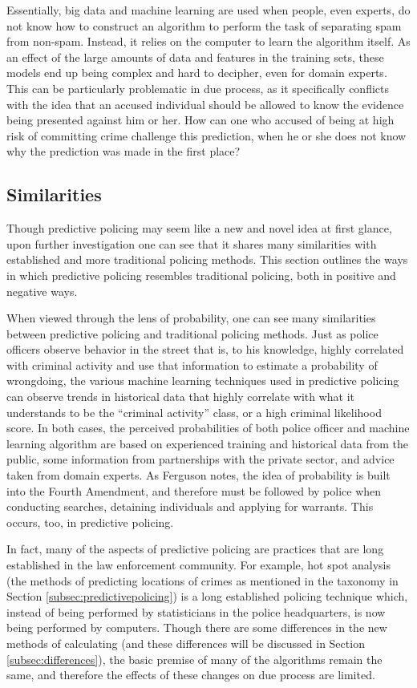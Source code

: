 \documentclass[12pt]{article} %
\begin{document}
Essentially, big data and machine learning are used when people, even experts, do not know how to construct an algorithm to perform the task of separating spam from non-spam. Instead, it relies on the computer to learn the algorithm itself. As an effect of the large amounts of data and features in the training sets, these models end up being complex and hard to decipher, even for domain experts. This can be particularly problematic in due process, as it specifically conflicts with the idea that an accused individual should be allowed to know the evidence being presented against him or her. How can one who accused of being at high risk of committing crime challenge this prediction, when he or she does not know why the prediction was made in the first place?

\subsection{Similarities} \label{subsec:Similarities}
Though predictive policing may seem like a new and novel idea at first glance, upon further investigation one can see that it shares many similarities with established and more traditional policing methods. This section outlines the ways in which predictive policing resembles traditional policing, both in positive and negative ways.

When viewed through the lens of probability, one can see many similarities between predictive policing and traditional policing methods. Just as police officers observe behavior in the street that is, to his knowledge, highly correlated with criminal activity and use that information to estimate a probability of wrongdoing, the various machine learning techniques used in predictive policing can observe trends in historical data that highly correlate with what it understands to be the ``criminal activity'' class, or a high criminal likelihood score. In both cases, the perceived probabilities of both police officer and machine learning algorithm are based on experienced training and historical data from the public, some information from partnerships with the private sector, and advice taken from domain experts. As Ferguson notes, the idea of probability is built into the Fourth Amendment, and therefore must be followed by police when conducting searches, detaining individuals and applying for warrants. This occurs, too, in predictive policing.\cite{ferguson2012predictive}

In fact, many of the aspects of predictive policing are practices that are long established in the law enforcement community. \cite{pearsall2010predictive} For example, hot spot analysis (the methods of predicting locations of crimes as mentioned in the taxonomy in Section \ref{subsec:predictivepolicing}) is a long established policing technique which, instead of being performed by statisticians in the police headquarters, is now being performed by computers. Though there are some differences in the new methods of calculating  (and these differences will be discussed in Section \ref{subsec:differences}), the basic premise of many of the algorithms remain the same, and therefore the effects of these changes on due process are limited.
\end{document}
